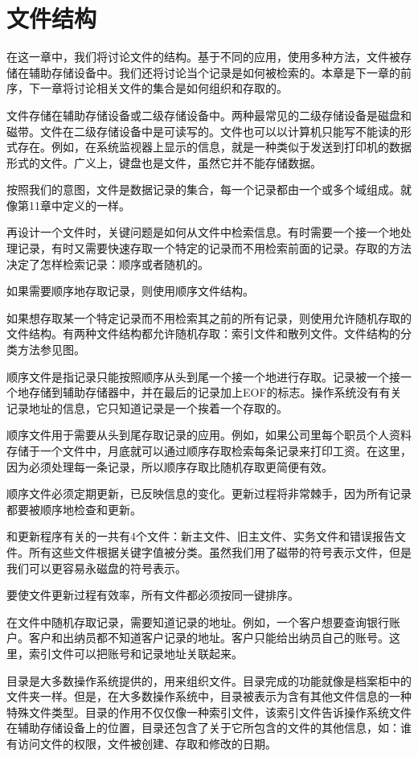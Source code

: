 \chapter{文件结构}
在这一章中，我们将讨论文件的结构。基于不同的应用，使用多种方法，文件被存储在辅助存储设备中。我们还将讨论当个记录是如何被检索的。本章是下一章的前序，下一章将讨论相关文件的集合是如何组织和存取的。

文件存储在辅助存储设备或二级存储设备中。两种最常见的二级存储设备是磁盘和磁带。文件在二级存储设备中是可读写的。文件也可以以计算机只能写不能读的形式存在。例如，在系统监视器上显示的信息，就是一种类似于发送到打印机的数据形式的文件。广义上，键盘也是文件，虽然它并不能存储数据。

按照我们的意图，文件是数据记录的集合，每一个记录都由一个或多个域组成。就像第11章中定义的一样。

再设计一个文件时，关键问题是如何从文件中检索信息。有时需要一个接一个地处理记录，有时又需要快速存取一个特定的记录而不用检索前面的记录。存取的方法决定了怎样检索记录：顺序或者随机的。

如果需要顺序地存取记录，则使用顺序文件结构。

如果想存取某一个特定记录而不用检索其之前的所有记录，则使用允许随机存取的文件结构。有两种文件结构都允许随机存取：索引文件和散列文件。文件结构的分类方法参见图。

顺序文件是指记录只能按照顺序从头到尾一个接一个地进行存取。记录被一个接一个地存储到辅助存储器中，并在最后的记录加上EOF的标志。操作系统没有有关记录地址的信息，它只知道记录是一个挨着一个存取的。

顺序文件用于需要从头到尾存取记录的应用。例如，如果公司里每个职员个人资料存储于一个文件中，月底就可以通过顺序存取检索每条记录来打印工资。在这里，因为必须处理每一条记录，所以顺序存取比随机存取更简便有效。

顺序文件必须定期更新，已反映信息的变化。更新过程将非常棘手，因为所有记录都要被顺序地检查和更新。

和更新程序有关的一共有4个文件：新主文件、旧主文件、实务文件和错误报告文件。所有这些文件根据关键字值被分类。虽然我们用了磁带的符号表示文件，但是我们可以更容易永磁盘的符号表示。

要使文件更新过程有效率，所有文件都必须按同一键排序。

在文件中随机存取记录，需要知道记录的地址。例如，一个客户想要查询银行账户。客户和出纳员都不知道客户记录的地址。客户只能给出纳员自己的账号。这里，索引文件可以把账号和记录地址关联起来。

目录是大多数操作系统提供的，用来组织文件。目录完成的功能就像是档案柜中的文件夹一样。但是，在大多数操作系统中，目录被表示为含有其他文件信息的一种特殊文件类型。目录的作用不仅仅像一种索引文件，该索引文件告诉操作系统文件在辅助存储设备上的位置，目录还包含了关于它所包含的文件的其他信息，如：谁有访问文件的权限，文件被创建、存取和修改的日期。

